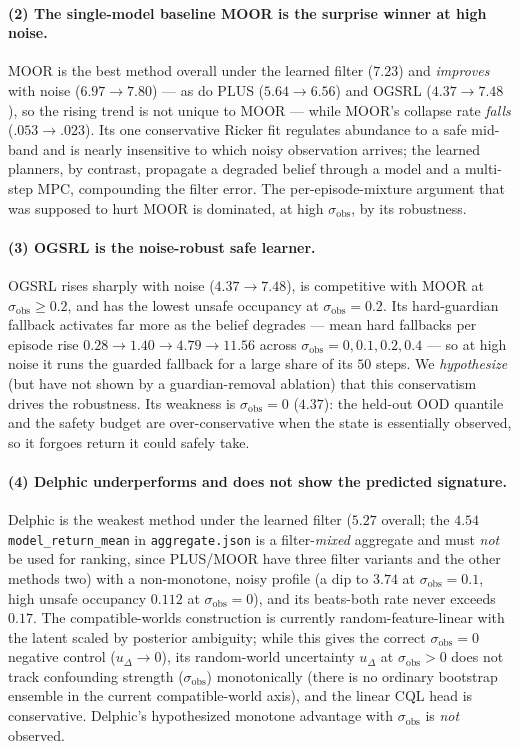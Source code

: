\documentclass[11pt]{article}
\newcommand{\sobs}{\sigma_{\mathrm{obs}}}
\begin{document}
\paragraph{(2) The single-model baseline MOOR is the surprise winner at high noise.}
MOOR is the best method overall under the learned filter ($7.23$) and
\emph{improves} with noise ($6.97\!\to\!7.80$) --- as do PLUS ($5.64\!\to\!6.56$)
and OGSRL ($4.37\!\to\!7.48$), so the rising trend is not unique to MOOR --- while
MOOR's collapse rate \emph{falls} ($.053\!\to\!.023$). Its
one conservative Ricker fit regulates abundance to a safe mid-band and is nearly
insensitive to which noisy observation arrives; the learned planners, by contrast,
propagate a degraded belief through a model and a multi-step MPC, compounding the
filter error. The per-episode-mixture argument that was supposed to hurt MOOR is
dominated, at high $\sobs$, by its robustness.

\paragraph{(3) OGSRL is the noise-robust safe learner.} OGSRL rises sharply with
noise ($4.37\!\to\!7.48$), is competitive with MOOR at $\sobs\!\ge\!0.2$, and has
the lowest unsafe occupancy at $\sobs{=}0.2$. Its hard-guardian fallback activates
far more as the belief degrades --- mean hard fallbacks per episode rise
$0.28\!\to\!1.40\!\to\!4.79\!\to\!11.56$ across $\sobs{=}0,0.1,0.2,0.4$ --- so at
high noise it runs the guarded fallback for a large share of its $50$ steps. We
\emph{hypothesize} (but have not shown by a guardian-removal ablation) that this
conservatism drives the robustness. Its weakness is $\sobs{=}0$ ($4.37$): the
held-out OOD quantile and the safety budget are over-conservative when the state is
essentially observed, so it forgoes return it could safely take.

\paragraph{(4) Delphic underperforms and does not show the predicted signature.}
Delphic is the weakest method under the learned filter ($5.27$ overall; the $4.54$
\texttt{model\_return\_mean} in \texttt{aggregate.json} is a filter-\emph{mixed}
aggregate and must \emph{not} be used for ranking, since PLUS/MOOR have three filter
variants and the other methods two) with a non-monotone, noisy profile (a dip to
$3.74$ at $\sobs{=}0.1$, high unsafe occupancy $0.112$ at $\sobs{=}0$), and its
beats-both rate never exceeds $0.17$. The compatible-worlds construction is
currently random-feature-linear with the latent scaled by posterior ambiguity;
while this gives the correct $\sobs{=}0$ negative control ($u_\Delta\!\to\!0$), its
random-world uncertainty $u_\Delta$ at $\sobs{>}0$ does not track confounding
strength ($\sobs$) monotonically (there is no ordinary bootstrap ensemble in the
current compatible-world axis), and the linear CQL head is conservative. Delphic's
hypothesized monotone advantage with $\sobs$ is \emph{not} observed.
\end{document}
